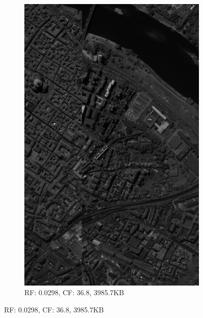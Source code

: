 \begin{figure}[]
\centering
\ContinuedFloat
\begin{subfigure}{\textwidth}
  \centering
  \includegraphics[width=0.85\linewidth]{images/example_compression_Pavia_Centre_0_025.png}
  \caption{RF: 0.0298, CF: 36.8, 3985.7KB}
\end{subfigure}
\end{figure}
